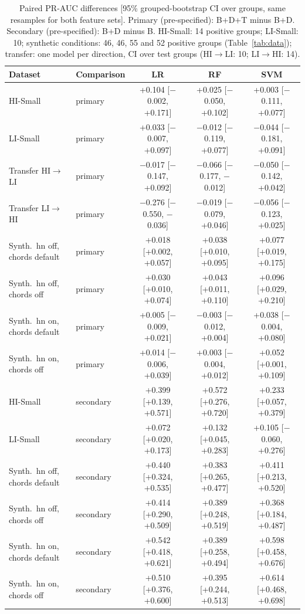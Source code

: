 \documentclass[conference]{IEEEtran}
\newcommand{\mi}{\ensuremath{-}}
\begin{document}
\begin{table}[t]
\caption{Paired PR-AUC differences [95\% grouped-bootstrap CI over groups, same resamples for both feature sets]. Primary (pre-specified): B+D+T minus B+D. Secondary (pre-specified): B+D minus B. HI-Small: 14 positive groups; LI-Small: 10; synthetic conditions: 46, 46, 55 and 52 positive groups (Table~\ref{tab:data}); transfer: one model per direction, CI over test groups (HI$\to$LI: 10; LI$\to$HI: 14).}
\label{tab:paired}
\centering
\footnotesize
\setlength{\tabcolsep}{4pt}
\begin{tabular}{@{}llccc@{}}
\toprule
Dataset & Comparison & LR & RF & SVM \\
\midrule
HI-Small & primary & +0.104 [\mi0.002, +0.171] & +0.025 [\mi0.050, +0.102] & +0.003 [\mi0.111, +0.077] \\
LI-Small & primary & +0.033 [\mi0.007, +0.097] & \mi0.012 [\mi0.119, +0.077] & \mi0.044 [\mi0.181, +0.091] \\
Transfer HI$\to$LI & primary & \mi0.017 [\mi0.147, +0.092] & \mi0.066 [\mi0.177, \mi0.012] & \mi0.050 [\mi0.142, +0.042] \\
Transfer LI$\to$HI & primary & \mi0.276 [\mi0.550, \mi0.036] & \mi0.019 [\mi0.079, +0.046] & \mi0.056 [\mi0.123, +0.025] \\
Synth.\ hn off, chords default & primary & +0.018 [+0.002, +0.057] & +0.038 [+0.010, +0.095] & +0.077 [+0.019, +0.175] \\
Synth.\ hn off, chords off & primary & +0.030 [+0.010, +0.074] & +0.043 [+0.011, +0.110] & +0.096 [+0.029, +0.210] \\
Synth.\ hn on, chords default & primary & +0.005 [\mi0.009, +0.021] & \mi0.003 [\mi0.012, +0.004] & +0.038 [\mi0.004, +0.080] \\
Synth.\ hn on, chords off & primary & +0.014 [\mi0.006, +0.039] & +0.003 [\mi0.004, +0.012] & +0.052 [+0.001, +0.109] \\
\midrule
HI-Small & secondary & +0.399 [+0.139, +0.571] & +0.572 [+0.276, +0.720] & +0.233 [+0.057, +0.379] \\
LI-Small & secondary & +0.072 [+0.020, +0.173] & +0.132 [+0.045, +0.283] & +0.105 [\mi0.060, +0.276] \\
Synth.\ hn off, chords default & secondary & +0.440 [+0.324, +0.535] & +0.383 [+0.265, +0.477] & +0.411 [+0.213, +0.520] \\
Synth.\ hn off, chords off & secondary & +0.414 [+0.290, +0.509] & +0.389 [+0.248, +0.519] & +0.368 [+0.184, +0.487] \\
Synth.\ hn on, chords default & secondary & +0.542 [+0.418, +0.621] & +0.389 [+0.258, +0.494] & +0.598 [+0.458, +0.676] \\
Synth.\ hn on, chords off & secondary & +0.510 [+0.376, +0.600] & +0.395 [+0.244, +0.513] & +0.614 [+0.468, +0.698] \\
\bottomrule
\end{tabular}
\end{table}
\end{document}
